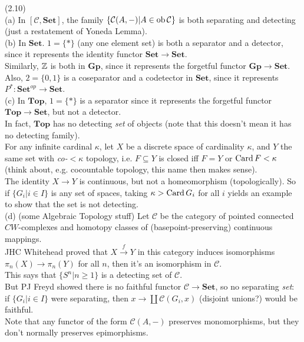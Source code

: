 \documentclass[a4paper]{article}
\begin{document}
\begin{eg} (2.10)\\
    (a) In $[\mathcal{C},\mathbf{Set}]$, the family $\{\mathcal{C}(A,-)|A \in \operatorname{ob}\mathcal{C}\}$ is both separating and detecting (just a restatement of Yoneda Lemma).\\
    (b) In $\mathbf{Set}$. $1=\{*\}$ (any one element set) is both a separator and a detector, since it represents the identity functor $\mathbf{Set} \to \mathbf{Set}$.\\
    Similarly, $\mathbb{Z}$ is both in $\mathbf{Gp}$, since it represents the forgetful functor $\mathbf{Gp} \to \mathbf{Set}$.\\
    Also, $2 = \{0,1\}$ is a coseparator and a codetector in $\mathbf{Set}$, since it represents $P^*: \mathbf{Set}^{op} \to \mathbf{Set}$.\\
    (c) In $\mathbf{Top}$, $1=\{*\}$ is a separator since it represents the forgetful functor $\mathbf{Top} \to \mathbf{Set}$, but not a detector.\\
    In fact, $\mathbf{Top}$ has no detecting \emph{set} of objects (note that this doesn't mean it has no detecting family).\\
    For any infinite cardinal $\kappa$, let $X$ be a discrete space of cardinality $\kappa$, and $Y$ the same set with \emph{co-$<\kappa$} topology, i.e. $F \subseteq Y$ is closed iff $F=Y$ or $\operatorname{Card} F < \kappa$ (think about, e.g. cocountable topology, this name then makes sense).\\
    The identity $X \to Y$ is continuous, but not a homeomorphism (topologically). So if $\{G_i|i \in I\}$ is any set of spaces, taking $\kappa > \operatorname{Card} G_i$ for all $i$ yields an example to show that the set is not detecting.\\
    (d) (some Algebraic Topology stuff) Let $\mathcal{C}$ be the category of pointed connected $CW$-complexes and homotopy classes of (basepoint-preserving) continuous mappings.\\
    JHC Whitehead proved that $X \xrightarrow{f} Y$ in this category induces isomorphisms $\pi_n(X) \to \pi_n(Y)$ for all $n$, then it's an isomorphism in $\mathcal{C}$.\\
    This says that $\{S^n | n \geq 1\}$ is a detecting set of $\mathcal{C}$.\\
    But PJ Freyd showed there is no faithful functor $\mathcal{C} \to \mathbf{Set}$, so no separating \emph{set}: if $\{ G_i | i \in I\}$ were separating, then $x \to \coprod \mathcal{C}(G_i,x)$ (disjoint unions?) would be faithful.\\
    Note that any functor of the form $\mathcal{C}(A,-)$ preserves monomorphisms, but they don't normally preserves epimorphisms.
\end{eg}
\end{document}
